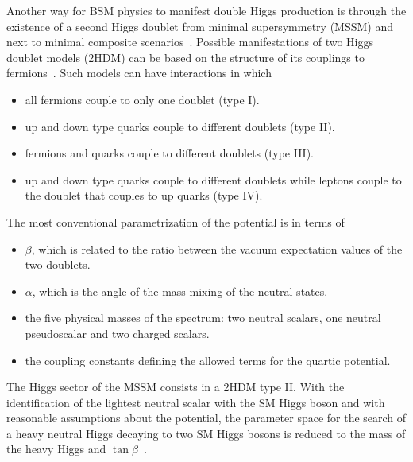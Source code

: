%

Another way for BSM physics to manifest double Higgs production is through the existence of
a second Higgs doublet from minimal supersymmetry (MSSM) and next to minimal composite
scenarios~\cite{Barbieri:2013nka,2hdmextensions}.
Possible manifestations of two Higgs doublet models (2HDM) can be based on the structure
of its couplings to fermions~\cite{Branco:2011iw}. Such models can have interactions in which
\begin{itemize}
\item all fermions couple to only one doublet (type I).
\item up and down type quarks couple to different doublets (type II).
\item fermions and quarks couple to different doublets (type III).
\item up and down type quarks couple to different doublets while leptons couple to the doublet that couples to up quarks (type IV).
\end{itemize}
The most conventional parametrization of the potential is in terms of
\begin{itemize}
  \item $\beta$, which is related to the ratio between the vacuum expectation values of the two doublets. 
  \item $\alpha$, which is the angle of the mass mixing of the neutral states.%
  \item the five physical masses of the spectrum: two neutral scalars, one neutral pseudoscalar and two charged scalars.
  \item the coupling constants defining the allowed terms for the quartic potential.
\end{itemize} 

The Higgs sector of the MSSM consists in a 2HDM type II. 
With the identification of the lightest neutral scalar with the SM Higgs boson and with
reasonable assumptions about the potential, the parameter space for the search of a heavy neutral Higgs
decaying to two SM Higgs bosons
is reduced to the mass of the heavy Higgs and
$\tan \beta$~\cite{Branco:2011iw,Craig:2012vn,Craig:2013hca,Djouadi:2005gj}.%

